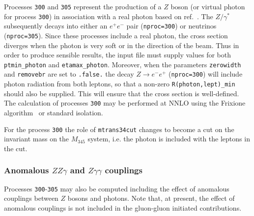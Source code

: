 Processes {\tt 300} and {\tt 305} represent the production of a $Z$ boson (or virtual photon for process {\tt 300})
in association with a real photon based on ref.~\cite{Campbell:2017aul}. The $Z/\gamma^*$ subsequently decays into 
either an $e^+ e^-$ pair ({\tt nproc=300}) or neutrinos ({\tt nproc=305}).
Since these processes include a real photon, the cross section diverges
when the photon is very soft or in the direction of the beam.
Thus in order to produce sensible results, the input file must supply values for both
{\tt ptmin\_photon} and {\tt etamax\_photon}. Moreover, when the parameters {\tt zerowidth}
and {\tt removebr} are set to {\tt .false.} the decay $Z \to e^- e^+$ ({\tt nproc=300})
will include photon radiation from both leptons, so that a non-zero {\tt R(photon,lept)\_min}
should also be supplied. This will ensure that the cross section is well-defined.
The calculation of processes {\tt 300} may be performed
at NNLO using the Frixione algorithm~\cite{Frixione:1998jh} or standard isolation. 

For the process {\tt 300}  the role of {\tt mtrans34cut} changes to become a cut 
on the invariant mass on the $M_{345}$ system, i.e. the photon is included with the leptons in the cut. 

\subsubsection{Anomalous $ZZ\gamma$ and $Z\gamma\gamma$ couplings}
Processes {\tt 300}-{\tt 305} may also be computed including the effect of anomalous couplings between $Z$ bosons and 
photons.
Note that, at present, the effect of anomalous couplings is not included in the gluon-gluon
initiated contributions.

